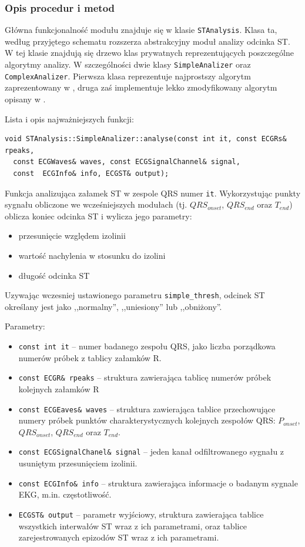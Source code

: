 \documentclass[a4paper, 11pt]{article}
\begin{document}
\subsubsection{Opis procedur i metod}
\label{sec:st_interval:procs}

Główna funkcjonalność modułu znajduje się w klasie \verb|STAnalysis|. Klasa ta,
według przyjętego schematu rozszerza abstrakcyjny moduł analizy odcinka ST. W
tej klasie znajdują się drzewo klas prywatnych reprezentujących poszczególne
algorytmy analizy. W szczególności dwie klasy \verb|SimpleAnalizer| oraz
\verb|ComplexAnalizer|. Pierwsza klasa reprezentuje najprostszy algorytm
zaprezentowany w \cite[p.~155]{AUGUST1}, druga zaś implementuje lekko
zmodyfikowany algorytm opisany w \cite{SHEN1}.

Lista i opis najważniejszych funkcji:

\begin{lstlisting}
void STAnalysis::SimpleAnalizer::analyse(const int it, const ECGRs& rpeaks,
  const ECGWaves& waves, const ECGSignalChannel& signal,
  const  ECGInfo& info, ECGST& output);
\end{lstlisting}

Funkcja analizująca załamek ST w zespole QRS numer \verb|it|. Wykorzystując
punkty sygnału obliczone we wcześniejszych modułach (tj. $QRS_{onset}$,
$QRS_{end}$ oraz $T_{end}$) oblicza koniec odcinka ST i wylicza jego parametry:
\begin{itemize}
  \item przesunięcie względem izolinii
  \item wartość nachylenia w stosunku do izolini
  \item długość odcinka ST
\end{itemize}
Uzywając wczesniej ustawionego parametru \verb|simple_thresh|, odcinek ST
określany jest jako ,,normalny'', ,,uniesiony'' lub ,,obniżony''.

Parametry:
\begin{itemize}
  \item \verb|const int it| -- numer badanego zespołu QRS, jako liczba
    porządkowa numerów próbek z tablicy załamków R.
  \item \verb|const ECGR& rpeaks| -- struktura zawierająca tablicę numerów
    próbek kolejnych załamków R
  \item \verb|const ECGEaves& waves| -- struktura zawierająca tablice
    przechowujące numery próbek punktów charakterystycznych kolejnych zespołów
    QRS: $P_{onset}$, $QRS_{onset}$, $QRS_{end}$ oraz $T_{end}$.
  \item \verb|const ECGSignalChanel& signal| -- jeden kanał odfiltrowanego
    sygnału z usuniętym przesunięciem izolinii.
  \item \verb|const ECGInfo& info| -- struktura zawierająca informacje o badanym
    sygnale EKG, m.in. częstotliwość.
  \item \verb|ECGST& output| -- parametr wyjściowy, struktura zawierająca
    tablice wszystkich interwałów ST wraz z ich parametrami, oraz tablice
    zarejestrowanych epizodów ST wraz z ich parametrami.
\end{itemize}
\end{document}
